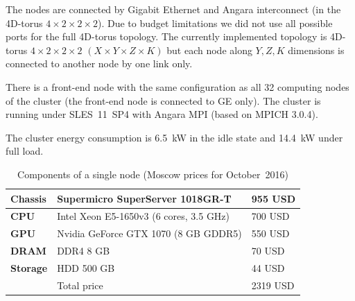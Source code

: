 \documentclass{llncs}
\begin{document}
The nodes are connected by Gigabit Ethernet and Angara interconnect (in the 4D-torus $4\times2\times2\times2$). Due to budget limitations we did not use all possible ports for the full 4D-torus topology. The currently implemented topology is 4D-torus $4\times2\times2\times2$ $(X \times Y \times Z \times K)$ but each node along $Y, Z, K$ dimensions is connected to another node by one link only.

There is a front-end node with the same configuration as all 32 computing nodes of the cluster (the front-end node is connected to GE only). The cluster is running under SLES~11~SP4 with Angara MPI (based on MPICH 3.0.4).

The cluster energy consumption is 6.5~kW in the idle state and 14.4~kW under full load.

\begin{table}[t]
\caption{\label{tab:node}Components of a single node (Moscow prices for October~2016)}
\begin{center}
\renewcommand{\arraystretch}{1}
\centering
\begin{tabular}{ p{20mm} p{65mm} p{20mm} }
\toprule
\textbf{Chassis} & Supermicro SuperServer 1018GR-T & 955 USD \\
\midrule
\textbf{CPU} & Intel Xeon E5-1650v3 (6 cores, 3.5 GHz) & 700 USD \\
\midrule
\textbf{GPU} & Nvidia GeForce GTX 1070 (8 GB GDDR5) & 550 USD \\
\midrule
\textbf{DRAM} & DDR4 8 GB & 70 USD\\
\midrule
\textbf{Storage} & HDD 500 GB & 44 USD\\
\midrule
& Total price & 2319 USD\\
\bottomrule
\end{tabular}
\end{center}
\end{table}
\end{document}

